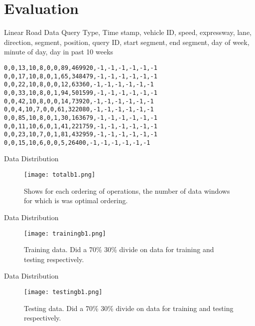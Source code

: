
\section{Evaluation}
\frame{\sectionpage}

\begin{frame}[fragile]{Linear Road Data}
Query Type, Time stamp, vehicle ID, speed, expressway, lane, direction, segment, position, query ID, start segment, end segment, day of week, minute of day, day in past 10 weeks
\begin{lstlisting}[caption= Example of Linear Road Data]
0,0,13,10,8,0,0,89,469920,-1,-1,-1,-1,-1,-1
0,0,17,10,8,0,1,65,348479,-1,-1,-1,-1,-1,-1
0,0,22,10,8,0,0,12,63360,-1,-1,-1,-1,-1,-1
0,0,33,10,8,0,1,94,501599,-1,-1,-1,-1,-1,-1
0,0,42,10,8,0,0,14,73920,-1,-1,-1,-1,-1,-1
0,0,4,10,7,0,0,61,322080,-1,-1,-1,-1,-1,-1
0,0,85,10,8,0,1,30,163679,-1,-1,-1,-1,-1,-1
0,0,11,10,6,0,1,41,221759,-1,-1,-1,-1,-1,-1
0,0,23,10,7,0,1,81,432959,-1,-1,-1,-1,-1,-1
0,0,15,10,6,0,0,5,26400,-1,-1,-1,-1,-1,-1
\end{lstlisting}
\end{frame}


\begin{frame}{Data Distribution}
    \begin{figure}
        \centering
        \texttt{[image: totalb1.png]}\\
        \caption{Shows for each ordering of operations, the number of data windows for which is was optimal ordering.}
        \label{fig:totalb1}
    \end{figure}
\end{frame}


\begin{frame}{Data Distribution}
    \begin{figure}
        \centering
        \texttt{[image: trainingb1.png]}\\
        \caption{Training data. Did a 70\% 30\% divide on data for training and testing respectively.}
        \label{fig:trainingb1}
    \end{figure}
\end{frame}

\begin{frame}{Data Distribution}
    \begin{figure}
        \centering
        \texttt{[image: testingb1.png]}\\
        \caption{Testing data. Did a 70\% 30\% divide on data for training and testing respectively.}
        \label{fig:testingb1}
    \end{figure}
\end{frame}

